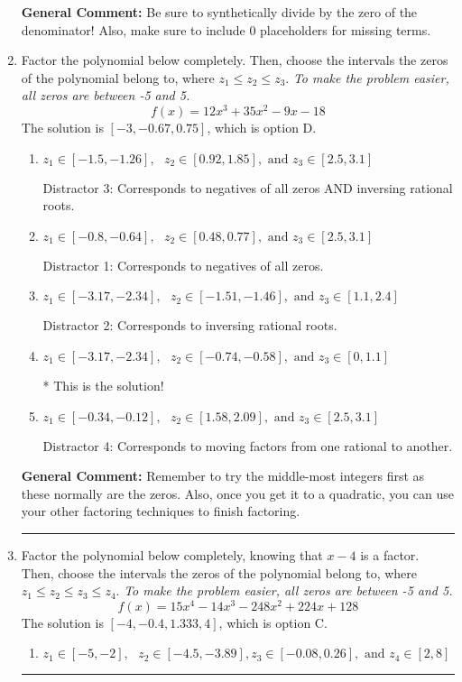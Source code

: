 \documentclass{extbook}[14pt]
\newcommand{\litem}[1]{\item #1

\rule{\textwidth}{0.4pt}}
\begin{document}
\begin{enumerate}
{\textbf{General Comment:} Be sure to synthetically divide by the zero of the denominator! Also, make sure to include 0 placeholders for missing terms.
}
\litem{
Factor the polynomial below completely. Then, choose the intervals the zeros of the polynomial belong to, where $z_1 \leq z_2 \leq z_3$. \textit{To make the problem easier, all zeros are between -5 and 5.}
\[ f(x) = 12x^{3} +35 x^{2} -9 x -18 \]The solution is \( [-3, -0.67, 0.75] \), which is option D.\begin{enumerate}[label=\Alph*.]
\item \( z_1 \in [-1.5, -1.26], \text{   }  z_2 \in [0.92, 1.85], \text{   and   } z_3 \in [2.5, 3.1] \)

 Distractor 3: Corresponds to negatives of all zeros AND inversing rational roots.
\item \( z_1 \in [-0.8, -0.64], \text{   }  z_2 \in [0.48, 0.77], \text{   and   } z_3 \in [2.5, 3.1] \)

 Distractor 1: Corresponds to negatives of all zeros.
\item \( z_1 \in [-3.17, -2.34], \text{   }  z_2 \in [-1.51, -1.46], \text{   and   } z_3 \in [1.1, 2.4] \)

 Distractor 2: Corresponds to inversing rational roots.
\item \( z_1 \in [-3.17, -2.34], \text{   }  z_2 \in [-0.74, -0.58], \text{   and   } z_3 \in [0, 1.1] \)

* This is the solution!
\item \( z_1 \in [-0.34, -0.12], \text{   }  z_2 \in [1.58, 2.09], \text{   and   } z_3 \in [2.5, 3.1] \)

 Distractor 4: Corresponds to moving factors from one rational to another.
\end{enumerate}

\textbf{General Comment:} Remember to try the middle-most integers first as these normally are the zeros. Also, once you get it to a quadratic, you can use your other factoring techniques to finish factoring.
}
\litem{
Factor the polynomial below completely, knowing that $x -4$ is a factor. Then, choose the intervals the zeros of the polynomial belong to, where $z_1 \leq z_2 \leq z_3 \leq z_4$. \textit{To make the problem easier, all zeros are between -5 and 5.}
\[ f(x) = 15x^{4} -14 x^{3} -248 x^{2} +224 x + 128 \]The solution is \( [-4, -0.4, 1.333, 4] \), which is option C.\begin{enumerate}[label=\Alph*.]
\item \( z_1 \in [-5, -2], \text{   }  z_2 \in [-4.5, -3.89], z_3 \in [-0.08, 0.26], \text{   and   } z_4 \in [2, 8] \)


\end{enumerate}}
\end{enumerate}
\end{document}
